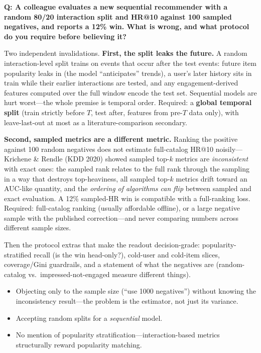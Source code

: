 \begin{interviewq}
\textbf{Q: A colleague evaluates a new sequential recommender with a random 80/20 interaction split and HR@10 against 100 sampled negatives, and reports a 12\% win. What is wrong, and what protocol do you require before believing it?}

 \quad {} \quad \badgefreq{\freqmed}

\stronganswer

Two independent invalidations. \textbf{First, the split leaks the future.} A random interaction-level split trains on events that occur after the test events: future item popularity leaks in (the model ``anticipates'' trends), a user's later history sits in train while their earlier interactions are tested, and any engagement-derived features computed over the full window encode the test set. Sequential models are hurt worst---the whole premise is temporal order. Required: a \textbf{global temporal split} (train strictly before $T$, test after, features from pre-$T$ data only), with leave-last-out at most as a literature-comparison secondary.

\textbf{Second, sampled metrics are a different metric.} Ranking the positive against 100 random negatives does not estimate full-catalog HR@10 noisily---Krichene \& Rendle (KDD 2020) showed sampled top-$k$ metrics are \textit{inconsistent} with exact ones: the sampled rank relates to the full rank through the sampling in a way that destroys top-heaviness, all sampled top-$k$ metrics drift toward an AUC-like quantity, and the \textit{ordering of algorithms can flip} between sampled and exact evaluation. A 12\% sampled-HR win is compatible with a full-ranking loss. Required: full-catalog ranking (usually affordable offline), or a large negative sample with the published correction---and never comparing numbers across different sample sizes.

Then the protocol extras that make the readout decision-grade: popularity-stratified recall (is the win head-only?), cold-user and cold-item slices, coverage/Gini guardrails, and a statement of what the negatives are (random-catalog vs.\ impressed-not-engaged measure different things).

\redflags
\begin{itemize}
    \item Objecting only to the sample size (``use 1000 negatives'') without knowing the inconsistency result---the problem is the estimator, not just its variance.
    \item Accepting random splits for a \textit{sequential} model.
    \item No mention of popularity stratification---interaction-based metrics structurally reward popularity matching.
\end{itemize}


\end{interviewq}
